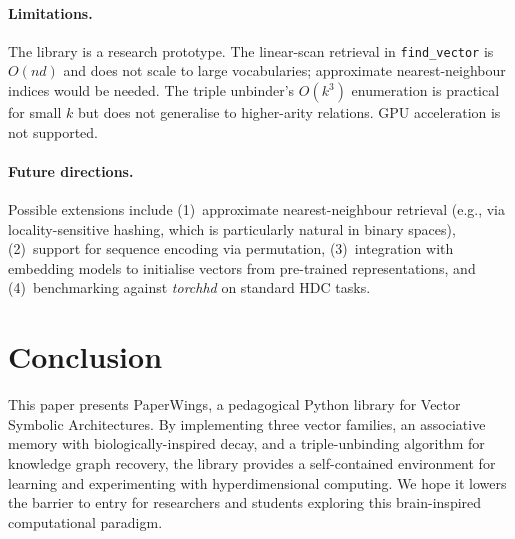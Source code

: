 \documentclass[11pt]{article}
\begin{document}
\paragraph{Limitations.} The library is a research prototype. The linear-scan retrieval in \texttt{find\_vector} is $O(nd)$ and does not scale to large vocabularies; approximate nearest-neighbour indices would be needed. The triple unbinder's $O(k^3)$ enumeration is practical for small $k$ but does not generalise to higher-arity relations. GPU acceleration is not supported.

\paragraph{Future directions.} Possible extensions include (1)~approximate nearest-neighbour retrieval (e.g., via locality-sensitive hashing, which is particularly natural in binary spaces), (2)~support for sequence encoding via permutation, (3)~integration with embedding models to initialise vectors from pre-trained representations, and (4)~benchmarking against \textit{torchhd} on standard HDC tasks.

\section{Conclusion}

This paper presents PaperWings, a pedagogical Python library for Vector Symbolic Architectures. By implementing three vector families, an associative memory with biologically-inspired decay, and a triple-unbinding algorithm for knowledge graph recovery, the library provides a self-contained environment for learning and experimenting with hyperdimensional computing. We hope it lowers the barrier to entry for researchers and students exploring this brain-inspired computational paradigm.


\end{document}
